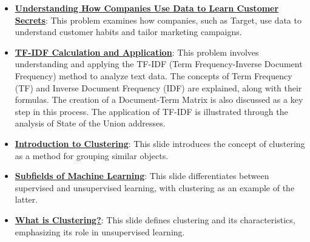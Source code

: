 \documentclass{article}%
\begin{document}
\begin{itemize}[leftmargin=*]
\item \href{https://purdue.brightspace.com/d2l/common/assets/pdfjs-d2l-dist/1.0.14-legacy/web/viewer.html?file=\%2Fcontent\%2Fenforced\%2F1095465-WL.202510.CS24200.LE1\%2F02L1-datas-intro.pdf\%3Fou\%3D1095465\&lang=en-us\&container=d2l-fileviewer-rendered-pdf\&fullscreen=d2l-fileviewer-rendered-pdf-dialog\&height=667#page=21}{\textbf{Understanding How Companies Use Data to Learn Customer Secrets}}: This problem examines how companies, such as Target, use data to understand customer habits and tailor marketing campaigns.%
\item \href{https://purdue.brightspace.com/d2l/common/assets/pdfjs-d2l-dist/1.0.14-legacy/web/viewer.html?file=\%2Fcontent\%2Fenforced\%2F1095465-WL.202510.CS24200.LE1\%2F05L1-parsing.pdf\%3Fou\%3D1095465\&lang=en-us\&container=d2l-fileviewer-rendered-pdf\&fullscreen=d2l-fileviewer-rendered-pdf-dialog\&height=667#page=21}{\textbf{TF-IDF Calculation and Application}}: This problem involves understanding and applying the TF-IDF (Term Frequency-Inverse Document Frequency) method to analyze text data. The concepts of Term Frequency (TF) and Inverse Document Frequency (IDF) are explained, along with their formulas. The creation of a Document-Term Matrix is also discussed as a key step in this process. The application of TF-IDF is illustrated through the analysis of State of the Union addresses.%
\item \href{https://purdue.brightspace.com/d2l/common/assets/pdfjs-d2l-dist/1.0.14-legacy/web/viewer.html?file=\%2Fcontent\%2Fenforced\%2F1095465-WL.202510.CS24200.LE1\%2F17L2-distance-clusters.pdf\%3Fou\%3D1095465\&lang=en-us\&container=d2l-fileviewer-rendered-pdf\&fullscreen=d2l-fileviewer-rendered-pdf-dialog\&height=667#page=2}{\textbf{Introduction to Clustering}}: This slide introduces the concept of clustering as a method for grouping similar objects.%
\item \href{https://purdue.brightspace.com/d2l/common/assets/pdfjs-d2l-dist/1.0.14-legacy/web/viewer.html?file=\%2Fcontent\%2Fenforced\%2F1095465-WL.202510.CS24200.LE1\%2F17L2-distance-clusters.pdf\%3Fou\%3D1095465\&lang=en-us\&container=d2l-fileviewer-rendered-pdf\&fullscreen=d2l-fileviewer-rendered-pdf-dialog\&height=667#page=3}{\textbf{Subfields of Machine Learning}}: This slide differentiates between supervised and unsupervised learning, with clustering as an example of the latter.%
\item \href{https://purdue.brightspace.com/d2l/common/assets/pdfjs-d2l-dist/1.0.14-legacy/web/viewer.html?file=\%2Fcontent\%2Fenforced\%2F1095465-WL.202510.CS24200.LE1\%2F17L2-distance-clusters.pdf\%3Fou\%3D1095465\&lang=en-us\&container=d2l-fileviewer-rendered-pdf\&fullscreen=d2l-fileviewer-rendered-pdf-dialog\&height=667#page=4}{\textbf{What is Clustering?}}: This slide defines clustering and its characteristics, emphasizing its role in unsupervised learning.%

\end{itemize}
\end{document}
